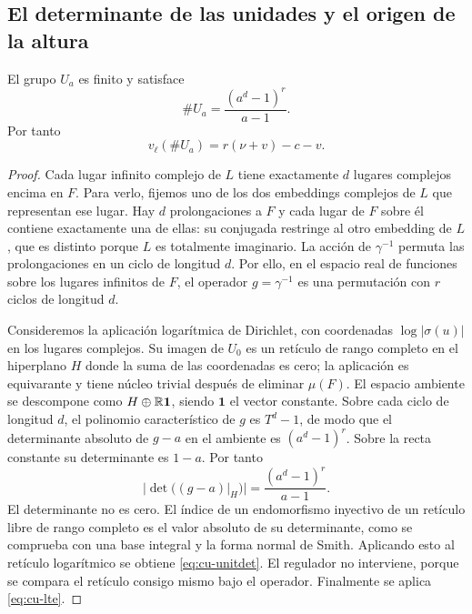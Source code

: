 \subsection{El determinante de las unidades y el origen de la altura}

\begin{teorema}
\label{thm:cu-unidades}
El grupo $U_a$ es finito y satisface
\begin{equation}
 \#U_a=\frac{(a^d-1)^r}{a-1}.
 \label{eq:cu-unitdet}
\end{equation}
Por tanto
\begin{equation}
 v_\ell(\#U_a)=r(\nu+v)-c-v.
 \label{eq:cu-unitval}
\end{equation}
\end{teorema}
\begin{proof}
Cada lugar infinito complejo de $L$ tiene exactamente $d$ lugares complejos encima en $F$. Para verlo, fijemos uno de los dos embeddings complejos de $L$ que representan ese lugar. Hay $d$ prolongaciones a $F$ y cada lugar de $F$ sobre él contiene exactamente una de ellas: su conjugada restringe al otro embedding de $L$, que es distinto porque $L$ es totalmente imaginario. La acción de $\gamma^{-1}$ permuta las prolongaciones en un ciclo de longitud $d$. Por ello, en el espacio real de funciones sobre los lugares infinitos de $F$, el operador $g=\gamma^{-1}$ es una permutación con $r$ ciclos de longitud $d$.

Consideremos la aplicación logarítmica de Dirichlet, con coordenadas $\log|\sigma(u)|$ en los lugares complejos. Su imagen de $U_0$ es un retículo de rango completo en el hiperplano $H$ donde la suma de las coordenadas es cero; la aplicación es equivarante y tiene núcleo trivial después de eliminar $\mu(F)$. El espacio ambiente se descompone como $H\oplus\mathbb{R}\mathbf{1}$, siendo $\mathbf{1}$ el vector constante. Sobre cada ciclo de longitud $d$, el polinomio característico de $g$ es $T^d-1$, de modo que el determinante absoluto de $g-a$ en el ambiente es $(a^d-1)^r$. Sobre la recta constante su determinante es $1-a$. Por tanto
\[
 |\det((g-a)|_H)|=\frac{(a^d-1)^r}{a-1}.
\]
El determinante no es cero. El índice de un endomorfismo inyectivo de un retículo libre de rango completo es el valor absoluto de su determinante, como se comprueba con una base integral y la forma normal de Smith. Aplicando esto al retículo logarítmico se obtiene \eqref{eq:cu-unitdet}. El regulador no interviene, porque se compara el retículo consigo mismo bajo el operador. Finalmente se aplica \eqref{eq:cu-lte}.
\end{proof}

